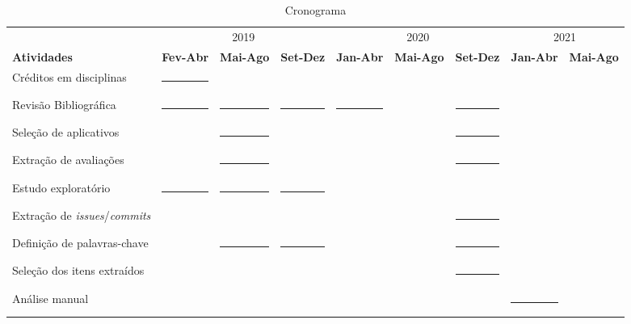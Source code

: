 \newcommand{\y}{\rule{18,5pt}{5pt}}
\newcommand{\x}{\hspace*{5pt}}
\begin{table}[h] \scriptsize
\setlength{\tabcolsep}{0pt}
 \caption{Cronograma}
 \label{tab:cronograma}

\begin{tabular}{|l|c|c|c|c|c|c|c|c|}
  \cline{2-9}
  \multicolumn{1}{l|}{} & \multicolumn{3}{c|}{2019} & \multicolumn{3}{c|}{2020} & \multicolumn{2}{c|}{2021} \\
  \cline{1-9}
  \textbf{Atividades} &   
  \textbf{Fev-Abr\hspace{3pt}} &   
  \textbf{Mai-Ago\hspace{3pt}} & 
  \textbf{Set-Dez\hspace{3pt}} &
  \textbf{Jan-Abr\hspace{3pt}} &   
  \textbf{Mai-Ago\hspace{3pt}} & 
  \textbf{Set-Dez\hspace{3pt}} &
  \textbf{Jan-Abr\hspace{3pt}} &   
  \textbf{Mai-Ago\hspace{3pt}} \\ 
  \hline
  Créditos em disciplinas
  & \y & \x & \x & \x & \x  & \x & \x & \x \\
  \hline
  
  
  Revisão Bibliográfica
  & \y & \y & \y & \y & \x  & \y & \x & \x \\
  \hline
  
  
  Seleção de aplicativos
  & \x & \y & \x & \x & \x & \y & \x & \x \\
  \hline
  
  
  Extração de avaliações
  & \x & \y & \x & \x & \x  & \y & \x & \x \\
  \hline
  
  Estudo exploratório
  & \y & \y & \y & \x & \x  & \x & \x & \x \\
  \hline
  
  Extração de \textit{issues}/\textit{commits}
  & \x & \x & \x & \x & \x  & \y & \x & \x \\
  \hline
  
  Definição de palavras-chave 
  & \x & \y & \y & \x & \x  & \y & \x & \x \\
  \hline
  
  Seleção dos itens extraídos
  & \x & \x & \x & \x & \x  & \y & \x & \x \\
  \hline
  
  Análise manual 
  & \x & \x & \x & \x & \x  & \x & \y & \x \\
  \hline
  

\end{tabular}
\end{table}
